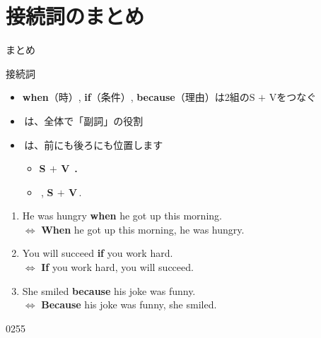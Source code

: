 \documentclass[aspectratio=169,xcolor={dvipsnames,table}]{beamer}
\begin{document}
\section{接続詞のまとめ}
\begin{frame}[plain]{まとめ}
\begin{block}{接続詞}
 \begin{itemize}[square]\small
  \item<1-> \textbf{when}（時）, \textbf{if}（条件）, \textbf{because}（理由）は2組のS $+$ Vをつなぐ
 \item<2->   \,は、全体で「副詞」の役割
 \item<3->   \,は、前にも後ろにも位置します
	 \begin{itemize}[circle]
	  \setlength{\itemsep}{4pt}
	  \item {\bfseries S $+$ V}\,\,\,\textbf{.}
	  \item {}\,,\,\,{\bfseries S $+$ V}\,.\hspace{20pt}\visible<4->{$\longleftarrow$\,コンマに注意！}
	 \end{itemize}
 \end{itemize}
\end{block}

\begin{enumerate}\small
 \item<5-> He was hungry \textbf{when} he got up this morning.\\
$\Longleftrightarrow$ \textbf{When} he got up this morning, he was hungry.
 \item<6-> You will succeed \textbf{if} you work hard.\\
$\Longleftrightarrow$ \textbf{If} you work hard, you will succeed.
 \item<7-> She smiled \textbf{because} his joke was funny.\\
$\Longleftrightarrow$ \textbf{Because} his joke was funny, she smiled.
\end{enumerate}
\hfill{\tiny 0255}\,{\scriptsize {}}
\end{frame}
\end{document}
